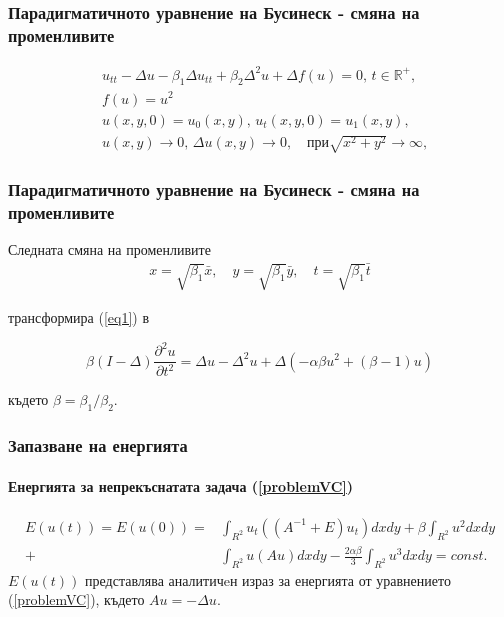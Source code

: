 \documentclass{beamer}
\newcommand{\be}{\begin{equation}}
\newcommand{\ee}{\end{equation}}
\newcommand{\rf}[1]{(\ref{#1})}
\newcommand{\RR}{\mathbb{R}}
\begin{document}
\begin{frame}
\frametitle{Парадигматичното уравнение на Бусинеск - смяна на променливите}

\begin{align}
&u_{tt} - \Delta u -\beta_1  \Delta u_{tt} +\beta_2 \Delta ^2 u + \Delta f(u)=0, \, t\in\RR^+,\label{eq1}
\\
&f(u) = u^2 \nonumber \\  \nonumber &u(x,y,0)=u_0(x,y), \, u_t(x,y,0)=u_1(x,y)  , 
\\  &u(x,y) \rightarrow 0, \,  \Delta u(x,y) \rightarrow 0 ,  \quad \text{при} \sqrt{x^2 + y^2} \rightarrow \infty, \label{eq11} 
\end{align}

\end{frame}


\begin{frame}
\frametitle{Парадигматичното уравнение на Бусинеск - смяна на променливите}
Следната смяна на променливите 
\begin{align}
x = \sqrt{\beta_1} \bar{x}, \quad y = \sqrt{\beta_1} \bar{y}, \quad t = \sqrt{\beta_1} \bar{t}
\end{align}

трансформира \rf{eq1} в

\be\label{problemVC}
\beta(I-\Delta) \frac{\partial^2 u}{\partial t^2}=
  \Delta u -\Delta^2 u +\Delta(-\alpha \beta u^2 + (\beta - 1 )u)
\ee

където $\beta = \beta_1/\beta_2$.

\end{frame}



\begin{frame}
\frametitle{Запазване на енергията}
\framesubtitle{Енергията за непрекъснатата задача \rf{problemVC}}
\begin{align}\label{ex-en}
E(u(t)) = E(u(0)) =&\int_{R^2} u_t \left((A^{-1}+E)u_t\right) dxdy+
\beta \int_{R^2} u^2 dxdy \nonumber\\
+& \int_{R^2}u \left(A u\right) dxdy
-\frac{2 \alpha \beta}{3} \int_{R^2} u^3 dxdy =const.
\end{align}
$E(u(t))$ представлява аналитичeн израз за енергията от уравнението \rf{problemVC}, където $Au=-\Delta u$.
\end{frame}

\end{document}
